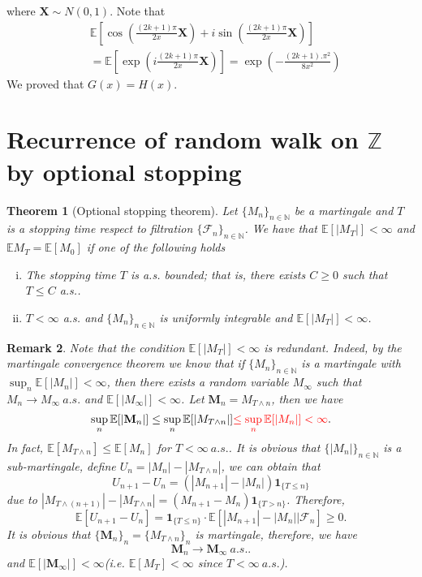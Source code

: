 \documentclass[11pt]{article}
\newtheorem{theorem}{Theorem}[section]
\newtheorem{remark}[theorem]{Remark}
\theoremstyle{definition}
\newcommand{\abs}[1]{\left\vert#1\right\vert}
\begin{document}
where $\mathbf{X}\sim N(0,1)$.
Note that 
\begin{equation*}
  \begin{aligned}
   &\mathbb{E}\left[\cos\left( \frac{(2k+1)\pi}{2x} \mathbf{X}\right)+i\sin\left( \frac{(2k+1)\pi}{2x} \mathbf{X}\right) \right]\\  
& =\mathbb{E}\left[ \exp\left(i \frac{(2k+1)\pi}{2x} \mathbf{X} \right) \right]= \exp\left(- \frac{(2k+1).\pi^2}{8x^2} \right)
  \end{aligned}
\end{equation*}
We proved that $G(x)=H(x)$.

\section{ Recurrence of  random walk on $\mathbb{Z}$ by optional stopping}
\begin{theorem}[Optional stopping theorem]
Let $\{M_n\}_{n\in \mathbb{N}}$ be a martingale and $T$ is a stopping time respect to filtration $\{\mathscr{F}_n\}_{n\in \mathbb{N}}$. We have  that $\mathbb{E}[\abs{M_T}]<\infty$ and $\mathbb{E}{M_T}=\mathbb{E}[M_0]$ if one of the following holds
\begin{enumerate}[(i)]
  \item The stopping time $T$ is a.s. bounded; that is, there exists $C \ge 0$ such that $T \le C$ a.s..
  \item $T<\infty$ a.s. and $\{M_n\}_{n\in \mathbb{N}}$ is uniformly integrable and $\mathbb{E}[\abs{M_T}]<\infty$.
\end{enumerate}
\end{theorem}
\begin{remark}
  Note that the condition $\mathbb{E}[\abs{M_T}]<\infty$ is redundant. Indeed, by the martingale convergence theorem we know that if $\{M_n\}_{n\in \mathbb{N}}$ is a martingale with $\sup_n \mathbb{E}[\abs{M_n}]<\infty$, then there exists a random variable $M_\infty$ such that $M_n\rightarrow M_\infty \ a.s.$ and $\mathbb{E}[\abs{M_\infty}]<\infty$. Let $\mathbf M_n=M_{T\wedge n}$, then we have
\[
\sup_n \mathbb{E}[\abs{\mathbf M_n}]\le \sup_n \mathbb{E}[\abs{M_{T\wedge n}}]{\color{red}\le \sup_n \mathbb{E}[\abs{M_n}]<\infty}.
\]
{\color{blue} In fact, $\mathbb{E}[M_{T\wedge n}]\le \mathbb{E}[M_n]$ for $T<\infty \ a.s. $. It is obvious that $\{\abs{M_n}\}_{n\in \mathbb{N}}$ is a sub-martingale, define $U_n=\abs{M_n}-\abs{M_{T\wedge n}}$, we can obtain that 
\[
U_{n+1}-U_n=(\abs{M_{n+1}}-\abs{M_n})\mathbf{1}_{\{T\le n\}}
\]
due to $\abs{M_{T\wedge(n+1)}} - \abs{M_{T\wedge n}}=(M_{n+1}-M_n) \mathbf{1}_{\{ T>n\}} $. Therefore,
\[
\mathbb{E}[U_{n+1}-U_n]=\mathbf{1}_{\{ T\le n \}}\cdot \mathbb{E}[\abs{M_{n+1}}-\abs{M_n}|\mathscr{F}_n]\ge 0.
\]
}
It is obvious that  $\{\mathbf M_n\}_n=\{M_{T\wedge n}\}_n$ is  martingale, therefore, we have
\[
\mathbf M_n\rightarrow \mathbf M_\infty\ a.s..
\]
and $\mathbb{E}[\abs{\mathbf M_\infty}]<\infty$(i.e. $\mathbb{E}[M_T]<\infty$ since $T<\infty \ a.s. $).
\end{remark}
\end{document}
